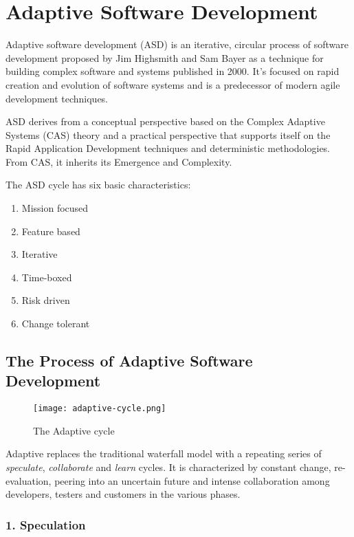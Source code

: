 \documentclass[main.tex]{subfiles}
\begin{document}
\section{Adaptive Software Development}

Adaptive software development (ASD) is an iterative, circular process of software development proposed by Jim Highsmith and Sam Bayer as a technique for building complex software and systems published in 2000.
It's focused on rapid creation and evolution of software systems and is a predecessor of modern agile development techniques.

ASD derives from a conceptual perspective based on the Complex Adaptive Systems (CAS) theory and a practical perspective that supports itself on the Rapid Application Development techniques and deterministic methodologies. From CAS, it inherits its Emergence and Complexity.

The ASD cycle has six basic characteristics:
\begin{enumerate}
	\item Mission focused
	\item Feature based
	\item Iterative
	\item Time-boxed
	\item Risk driven
	\item Change tolerant
\end{enumerate}

\subsection{The Process of Adaptive Software Development}

\begin{wrapfigure}[16]{l}[2em]{0.6\textwidth}
	\vspace*{-\baselineskip}
	\texttt{[image: adaptive-cycle.png]}
	\caption{The Adaptive cycle\label{fig:adaptive-cycle}}
\end{wrapfigure}

Adaptive replaces the traditional waterfall model with a repeating series of \emph{speculate}, \emph{collaborate} and \emph{learn} cycles.
It is characterized by constant change, re-evaluation, peering into an uncertain future and intense collaboration among developers, testers and customers in the various phases.

\subsubsection[Speculation]{1. Speculation}
\end{document}
